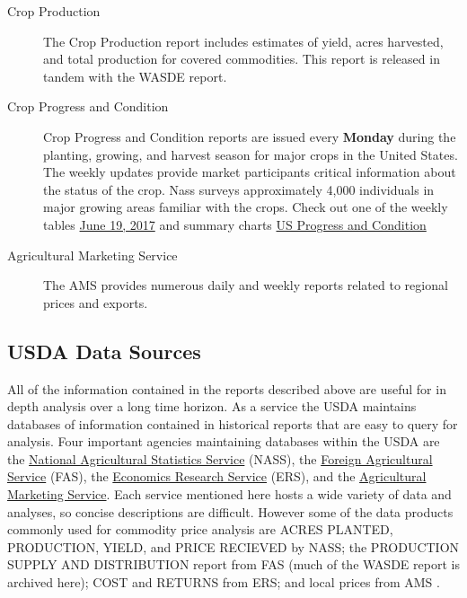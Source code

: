 \documentclass[
]{book}
\begin{document}
\begin{description}
\item[Crop Production]
The Crop Production report includes estimates of yield, acres harvested, and total production for covered commodities. This report is released in tandem with the WASDE report.
\item[Crop Progress and Condition]
Crop Progress and Condition reports are issued every \textbf{Monday} during the planting, growing, and harvest season for major crops in the United States. The weekly updates provide market participants critical information about the status of the crop. Nass surveys approximately 4,000 individuals in major growing areas familiar with the crops. Check out one of the weekly tables \href{http://usda.mannlib.cornell.edu/usda/nass/CropProg//2010s/2017/CropProg-06-19-2017.txt}{June 19, 2017} and summary charts \href{https://www.nass.usda.gov/Charts_and_Maps/Crop_Progress_\&_Condition/2016/US_2016.pdf}{US Progress and Condition}
\item[Agricultural Marketing Service]
The AMS provides numerous daily and weekly reports related to regional prices and exports.
\end{description}

\hypertarget{usda-data-sources}{%
\subsection{USDA Data Sources}\label{usda-data-sources}}

All of the information contained in the reports described above are useful for in depth analysis over a long time horizon. As a service the USDA maintains databases of information contained in historical reports that are easy to query for analysis. Four important agencies maintaining databases within the USDA are the \href{http://www.nass.usda.gov/}{National Agricultural Statistics Service} (NASS), the \href{http://apps.fas.usda.gov/psdonline/psdHome.aspx}{Foreign Agricultural Service} (FAS), the \href{http://www.ers.usda.gov/data-products.aspx}{Economics Research Service} (ERS), and the \href{http://www.ams.usda.gov/market-news/livestock-poultry-grain\#Grain}{Agricultural Marketing Service}. Each service mentioned here hosts a wide variety of data and analyses, so concise descriptions are difficult. However some of the data products commonly used for commodity price analysis are ACRES PLANTED, PRODUCTION, YIELD, and PRICE RECIEVED by NASS; the PRODUCTION SUPPLY AND DISTRIBUTION report from FAS (much of the WASDE report is archived here); COST and RETURNS from ERS; and local prices from AMS .
\end{document}
